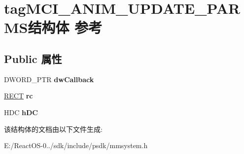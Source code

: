 \hypertarget{structtag_m_c_i___a_n_i_m___u_p_d_a_t_e___p_a_r_m_s}{}\section{tag\+M\+C\+I\+\_\+\+A\+N\+I\+M\+\_\+\+U\+P\+D\+A\+T\+E\+\_\+\+P\+A\+R\+M\+S结构体 参考}
\label{structtag_m_c_i___a_n_i_m___u_p_d_a_t_e___p_a_r_m_s}
\subsection*{Public 属性}
\begin{DoxyCompactItemize}
\item 
\mbox{\label{structtag_m_c_i___a_n_i_m___u_p_d_a_t_e___p_a_r_m_s_a0b831fddadeebb87ee8b45fc27bb24c4}} 
D\+W\+O\+R\+D\+\_\+\+P\+TR {\bfseries dw\+Callback}
\item 
\mbox{\label{structtag_m_c_i___a_n_i_m___u_p_d_a_t_e___p_a_r_m_s_af02decee04d80159d9fcf69b091921d1}} 
\hyperlink{structtag_r_e_c_t}{R\+E\+CT} {\bfseries rc}
\item 
\mbox{\label{structtag_m_c_i___a_n_i_m___u_p_d_a_t_e___p_a_r_m_s_a5697482b50a900f61f609e776adbb65c}} 
H\+DC {\bfseries h\+DC}
\end{DoxyCompactItemize}


该结构体的文档由以下文件生成\+:\begin{DoxyCompactItemize}
\item 
E\+:/\+React\+O\+S-\/0../sdk/include/psdk/mmsystem.\+h\end{DoxyCompactItemize}
